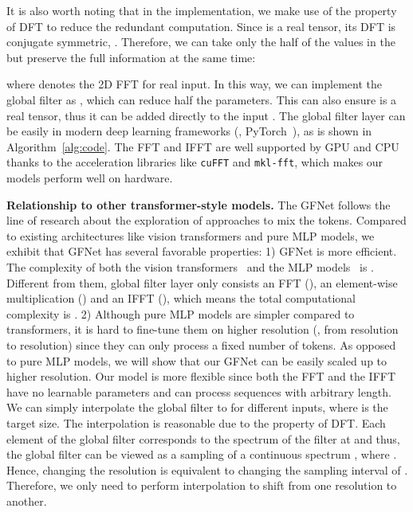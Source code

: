 \documentclass{article}
\numberwithin{equation}{section}
\newcommand{\gknet}{GFNet}
\newcommand{\paragrapha}[2][1pt]{\vspace{#1}\noindent\textbf{#2}}
\begin{document}
It is also worth noting that in the implementation, we make use of the property of DFT to reduce the redundant computation. Since  is a real tensor, its DFT  is conjugate symmetric, \ie . Therefore, we can take only the half of the values in the  but preserve the full information at the same time:

where  denotes the 2D FFT for real input. In this way, we can implement the global filter as , which can reduce half the parameters. This can also ensure  is a real tensor, thus it can be added directly to the input . The global filter layer can be easily in modern deep learning frameworks (\eg, PyTorch~\cite{paszke2019pytorch}), as is shown in Algorithm~\ref{alg:code}. The FFT and IFFT are well supported by GPU and CPU thanks to the acceleration libraries like \texttt{cuFFT} and \texttt{mkl-fft}, which makes our models perform well on hardware. 


\paragrapha{Relationship to other transformer-style models.} The \gknet{} follows the line of research about the exploration of approaches to mix the tokens. Compared to existing architectures like vision transformers and pure MLP models, we exhibit that \gknet{} has several favorable properties: 1) \gknet{} is more efficient. The complexity of both the vision transformers~\cite{dosovitskiy2020vit,touvron2020deit,touvron2021cait} and the MLP models~\cite{tolstikhin2021mlp,touvron2021resmlp} is . Different from them, global filter layer only consists an FFT (), an element-wise multiplication () and an IFFT (), which means the total computational complexity is . 2) Although pure MLP models are simpler compared to transformers, it is hard to fine-tune them on higher resolution (\eg{}, from  resolution to  resolution) since they can only process a fixed number of tokens. As opposed to pure MLP models, we will show that our \gknet{} can be easily scaled up to higher resolution. Our model is more flexible since both the FFT and the IFFT have no learnable parameters and can process sequences with arbitrary length. We can simply interpolate the global filter  to  for different inputs, where  is the target size. The interpolation is reasonable due to the property of DFT. Each element of the global filter  corresponds to the spectrum of the filter at  and thus, the global filter  can be viewed as a sampling of a continuous spectrum , where . Hence, changing the resolution is equivalent to changing the sampling interval of . Therefore, we only need to perform interpolation to shift from one resolution to another.
\end{document}
